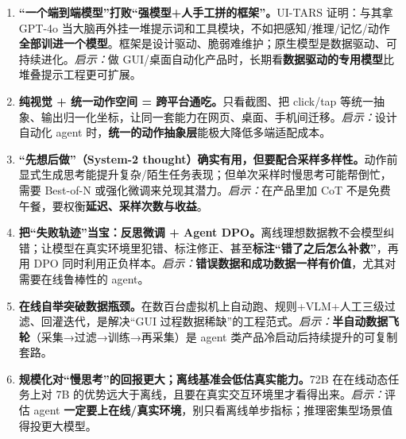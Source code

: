 \documentclass[11pt,UTF8,fontset=fandol]{ctexart}
\begin{document}
\begin{enumerate}[leftmargin=1.6em]
\item \textbf{“一个端到端模型”打败“强模型+人手工拼的框架”。}UI-TARS 证明：与其拿 GPT-4o 当大脑再外挂一堆提示词和工具模块，不如把感知/推理/记忆/动作\textbf{全部训进一个模型}。框架是设计驱动、脆弱难维护；原生模型是数据驱动、可持续进化。\emph{启示：}做 GUI/桌面自动化产品时，长期看\textbf{数据驱动的专用模型}比堆叠提示工程更可扩展。

\item \textbf{纯视觉 + 统一动作空间 = 跨平台通吃。}只看截图、把 click/tap 等统一抽象、输出归一化坐标，让同一套能力在网页、桌面、手机间迁移。\emph{启示：}设计自动化 agent 时，\textbf{统一的动作抽象层}能极大降低多端适配成本。

\item \textbf{“先想后做”（System-2 thought）确实有用，但要配合采样多样性。}动作前显式生成思考能提升复杂/陌生任务表现；但单次采样时慢思考可能帮倒忙，需要 Best-of-N 或强化微调来兑现其潜力。\emph{启示：}在产品里加 CoT 不是免费午餐，要权衡\textbf{延迟、采样次数与收益}。

\item \textbf{把“失败轨迹”当宝：反思微调 + Agent DPO。}离线理想数据教不会模型纠错；让模型在真实环境里犯错、标注修正、甚至\textbf{标注“错了之后怎么补救”}，再用 DPO 同时利用正负样本。\emph{启示：}\textbf{错误数据和成功数据一样有价值}，尤其对需要在线鲁棒性的 agent。

\item \textbf{在线自举突破数据瓶颈。}在数百台虚拟机上自动跑、规则+VLM+人工三级过滤、回灌迭代，是解决“GUI 过程数据稀缺”的工程范式。\emph{启示：}\textbf{半自动数据飞轮}（采集→过滤→训练→再采集）是 agent 类产品冷启动后持续提升的可复制套路。

\item \textbf{规模化对“慢思考”的回报更大；离线基准会低估真实能力。}72B 在在线动态任务上对 7B 的优势远大于离线，且要在真实交互环境里才看得出来。\emph{启示：}评估 agent \textbf{一定要上在线/真实环境}，别只看离线单步指标；推理密集型场景值得投更大模型。
\end{enumerate}
\end{document}
